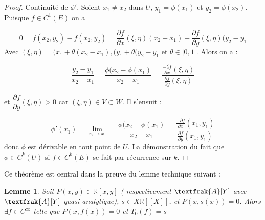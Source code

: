 \documentclass[12pt,a4paper]{amsart}
\newtheorem{lem}[thm]{\bf Lemme}
\begin{document}
\begin{proof}
Continuité de $\phi '$. Soient $x_{1} \neq x_{2}$ dans $U$, $y_{1}=\phi(x_{1})$ et $y_{2}=\phi(x_{2})$. Puisque $ f \in C^{1}(E)$ on a 

$$0=f(x_{2},y_{2})-f(x_{2},y_{2})= \dfrac{\partial f}{\partial x}(\xi, \eta)(x_{2}-x_{1}) + \dfrac{\partial f}{\partial y}(\xi, \eta)(y_{2}-y_{1}$$
Avec $(\xi,\eta)=(x_{1}+\theta (x_{2}-x_{1}),(y_{1}+\theta (y_{2}-y_{1}$ et $\theta \in ]0,1[$. Alors on a : 

$$\dfrac{y_{2}-y_{1}}{x_{2}-x_{1}}=\dfrac{\phi(x_{2}-\phi(x_{1})}{x_{2}-x_{1}}=\dfrac{\frac{-\partial f}{\partial x}(\xi, \eta )}{\frac{\partial f}{\partial y}(\xi ,\eta)}$$

et $\dfrac{\partial f}{\partial y}(\xi, \eta) > 0$ car $(\xi,\eta) \in V \subset W$. Il s'ensuit : 

$$ \phi'(x_{1})= \lim\limits_{x_{2} \to x_{1}} =\dfrac{\phi(x_{2}-\phi(x_{1})}{x_{2}-x_{1}}=\dfrac{\frac{-\partial f}{\partial x}(x_{1}, y_{1})}{\frac{\partial f}{\partial y}(x_{1}, y_{1})}$$
donc $\phi $ est dérivable en tout point de $U$. La démonstration du fait que $\phi \in C^{k}(U) $ si $f \in C^{k}(E)$ se fait par récurrence sur $k$. 
\end{proof}
Ce théorème est central dans la preuve du lemme technique suivant : 

\begin{lem}
Soit $P(x,y) \in \mathbb{R}[x,y]$ ( respectivement $\textfrak{A}[Y]$ avec $\textfrak{A}[Y]$ quasi analytique), $s \in X \mathbb{R}[[X]]$, et $P(x, s(x))=0$. Alors $\exists f \in C^{\infty}$ telle que $P(x,f(x))=0$ et $T_{0}(f)= s$
\end{lem}
\end{document}
